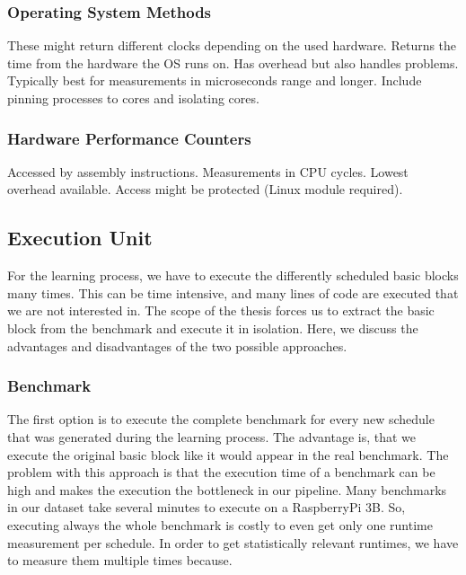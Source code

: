 \subsubsection{Operating System Methods}
These might return different clocks depending on the used hardware.
Returns the time from the hardware the OS runs on.
Has overhead but also handles problems.
Typically best for measurements in microseconds range and longer.
Include pinning processes to cores and isolating cores.
\subsubsection{Hardware Performance Counters}
\label{sec:approach:hwpercounter}
Accessed by assembly instructions.
Measurements in CPU cycles.
Lowest overhead available.
Access might be protected (Linux module required).

\subsection{Execution Unit}
\label{sec:approach:exec_unit}
For the learning process, we have to execute the differently scheduled basic blocks many times.
This can be time intensive, and many lines of code are executed that we are not interested in.
The scope of the thesis forces us to extract the basic block from the benchmark and execute it in isolation.
Here, we discuss the advantages and disadvantages of the two possible approaches.

\subsubsection{Benchmark}
The first option is to execute the complete benchmark for every new schedule that was generated during the learning process.
The advantage is, that we execute the original basic block like it would appear in the real benchmark.
The problem with this approach is that the execution time of a benchmark can be high and makes the execution the bottleneck in our pipeline.
Many benchmarks in our dataset take several minutes to execute on a RaspberryPi 3B.
So, executing always the whole benchmark is costly to even get only one runtime measurement per schedule.
In order to get statistically relevant runtimes, we have to measure them multiple times because.

